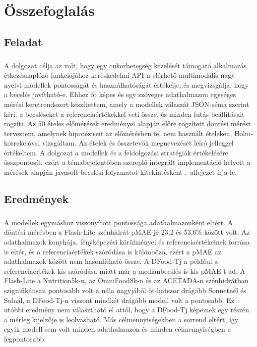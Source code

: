\chapter{Összefoglalás}

\section{Feladat}
\paragraph{}A dolgozat célja az volt, hogy egy cukorbetegség kezelését támogató alkalmazás 
étkezésnaplózó funkciójához kereskedelmi API-n elérhető multimodális nagy nyelvi modellek 
pontosságát és használhatóságát értékelje, és megvizsgálja, hogy a becslés javítható-e. Ehhez öt 
képes és egy szöveges adathalmazon egységes mérési keretrendszert készítettem, amely a modellek 
válaszát JSON-séma szerint kéri, a becsléseket a referenciaértékekkel veti össze, és minden futás 
beállításait rögzíti. Az 50 ételes előmérések eredményei alapján előre rögzített döntési mérést 
terveztem, amelynek hipotéziseit az előmérésben fel nem használt ételeken, Holm-korrekcióval 
vizsgáltam. Az ételek és összetevők megnevezését leíró jelleggel értékeltem. A dolgozat a modellek és 
a feldolgozási stratégiák értékelésére összpontosít, ezért a témabejelentőben szereplő integrált 
implementáció helyett a mérések alapján javasolt becslési folyamatot kitekintésként \az{\ref{sec:javasolt_folyamat}}.~alfejezet írja le.

\section{Eredmények}
\paragraph{}A modellek egymáshoz viszonyított pontossága adathalmazonként eltért. A döntési mérésben a Flash-Lite szénhidrát-pMAE-je 23,2 és 53,6\% között volt. Az 
adathalmazok konyhája, fényképezési körülményei és referenciaértékeinek forrása is eltér, 
és a referenciaértékek szóródása is különböző, ezért a pMAE az adathalmazok között nem hasonlítható 
össze. A DFood-Tj-n például a referenciaértékek kis szóródása miatt már a mediánbecslés is kis pMAE-t ad. 
A Flash-Lite a Nutrition5k-n, az OmniFood8k-n és az ACETADA-n szénhidrátban szignifikánsan pontosabb volt 
a nála nagyjából öt-hatszor drágább Sonnetnél és Solnál, a DFood-Tj-n viszont mindkét drágább modell volt 
a pontosabb. Ez utóbbi eredmény nem választható el attól, hogy a DFood-Tj képeinek egy részén a 
mérleg kijelzője is leolvasható. Más célmennyiségekben a sorrend eltért, így egyik modell sem volt 
minden adathalmazon és minden célmennyiségben a legpontosabb.

